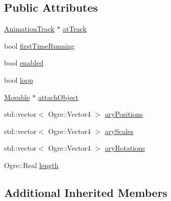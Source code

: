\subsection*{Public Attributes}
\begin{DoxyCompactItemize}
\item 
\hyperlink{class_rad_xml_1_1_animation_track}{Animation\-Track} $\ast$ \hyperlink{class_rad_xml_1_1_animation_track_object_ad7730cfc4500802f8771516334d611e6}{at\-Track}
\item 
bool \hyperlink{class_rad_xml_1_1_animation_track_object_a218a33b5d4bd687dfa681d3d319a55ef}{first\-Time\-Running}
\item 
bool \hyperlink{class_rad_xml_1_1_animation_track_object_ad1805842a4718bd9aad78ae2b04ad511}{enabled}
\item 
bool \hyperlink{class_rad_xml_1_1_animation_track_object_a440a788ddd3052c79acc55834cdceace}{loop}
\item 
\hyperlink{class_rad_xml_1_1_movable}{Movable} $\ast$ \hyperlink{class_rad_xml_1_1_animation_track_object_a06369b63f2ae38e18f63f0cca4421398}{attach\-Object}
\item 
std\-::vector$<$ Ogre\-::\-Vector4 $>$ \hyperlink{class_rad_xml_1_1_animation_track_object_af4e33dce343bd962dbdf3344de3b50ce}{ary\-Positions}
\item 
std\-::vector$<$ Ogre\-::\-Vector4 $>$ \hyperlink{class_rad_xml_1_1_animation_track_object_a1a33ddc98a8c0ab877076d5521821dd3}{ary\-Scales}
\item 
std\-::vector$<$ Ogre\-::\-Vector4 $>$ \hyperlink{class_rad_xml_1_1_animation_track_object_a3e961c717902d1dfe651c6fe2f74b347}{ary\-Rotations}
\item 
Ogre\-::\-Real \hyperlink{class_rad_xml_1_1_animation_track_object_a50a2662ae86082b9e9d536b208673a11}{length}
\end{DoxyCompactItemize}
\subsection*{Additional Inherited Members}


